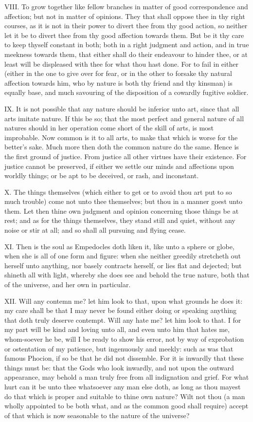 VIII. To grow together like fellow branches in matter of good
correspondence and affection; but not in matter of opinions. They that
shall oppose thee in thy right courses, as it is not in their power to
divert thee from thy good action, so neither let it be to divert thee from
thy good affection towards them. But be it thy care to keep thyself
constant in both; both in a right judgment and action, and in true
meekness towards them, that either shall do their endeavour to hinder
thee, or at least will be displeased with thee for what thou hast done.
For to fail in either (either in the one to give over for fear, or in the
other to forsake thy natural affection towards him, who by nature is both
thy friend and thy kinsman) is equally base, and much savouring of the
disposition of a cowardly fugitive soldier.

IX. It is not possible that any nature should be inferior unto art,
since that all arts imitate nature. If this be so; that the most perfect
and general nature of all natures should in her operation come short of
the skill of arts, is most improbable. Now common is it to all arts, to
make that which is worse for the better's sake. Much more then doth the
common nature do the same. Hence is the first ground of justice. From
justice all other virtues have their existence. For justice cannot be
preserved, if either we settle our minds and affections upon worldly
things; or be apt to be deceived, or rash, and inconstant.

X. The things themselves (which either to get or to avoid thou art put
to so much trouble) come not unto thee themselves; but thou in a manner
goest unto them. Let then thine own judgment and opinion concerning those
things be at rest; and as for the things themselves, they stand still and
quiet, without any noise or stir at all; and so shall all pursuing and
flying cease.

XI. Then is the soul as Empedocles doth liken it, like unto a sphere or
globe, when she is all of one form and figure: when she neither greedily
stretcheth out herself unto anything, nor basely contracts herself, or
lies flat and dejected; but shineth all with light, whereby she does see
and behold the true nature, both that of the universe, and her own in
particular.

XII. Will any contemn me? let him look to that, upon what grounds he
does it: my care shall be that I may never be found either doing or
speaking anything that doth truly deserve contempt. Will any hate me? let
him look to that. I for my part will be kind and loving unto all, and even
unto him that hates me, whom-soever he be, will I be ready to show his
error, not by way of exprobation or ostentation of my patience, but
ingenuously and meekly: such as was that famous Phocion, if so be that he
did not dissemble. For it is inwardly that these things must be: that the
Gods who look inwardly, and not upon the outward appearance, may behold a
man truly free from all indignation and grief. For what hurt can it be
unto thee whatsoever any man else doth, as long as thou mayest do that
which is proper and suitable to thine own nature? Wilt not thou (a man
wholly appointed to be both what, and as the common good shall require)
accept of that which is now seasonable to the nature of the universe?

